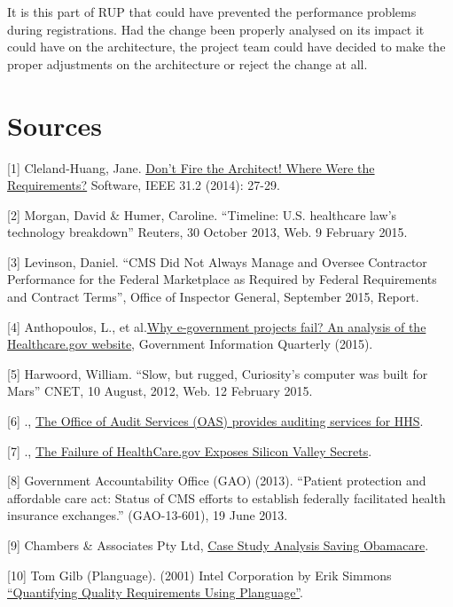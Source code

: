 \documentclass[]{article}
\begin{document}
It is this part of RUP that could have prevented the performance
problems during registrations. Had the change been properly analysed on
its impact it could have on the architecture, the project team could
have decided to make the proper adjustments on the architecture or
reject the change at all.

\section{Sources}\label{sources}

{[}1{]} Cleland-Huang, Jane.
\href{http://ieeexplore.ieee.org/stamp/stamp.jsp?tp=\&arnumber=6774318}{Don't
Fire the Architect! Where Were the Requirements?} Software, IEEE 31.2
(2014): 27-29.

{[}2{]} Morgan, David \& Humer, Caroline. ``Timeline: U.S. healthcare
law's technology breakdown'' Reuters, 30 October 2013, Web. 9 February
2015.

{[}3{]} Levinson, Daniel. ``CMS Did Not Always Manage and Oversee
Contractor Performance for the Federal Marketplace as Required by
Federal Requirements and Contract Terms'', Office of Inspector General,
September 2015, Report.

{[}4{]} Anthopoulos, L., et
al.\href{http://www.sciencedirect.com/science/article/pii/S0740624X15000799}{Why
e-government projects fail? An analysis of the Healthcare.gov website},
Government Information Quarterly (2015).

{[}5{]} Harwoord, William. ``Slow, but rugged, Curiosity's computer was
built for Mars'' CNET, 10 August, 2012, Web. 12 February 2015.

{[}6{]} .,
\href{http://oig.hhs.gov/oas/reports/region3/31403001.pdf}{The Office of
Audit Services (OAS) provides auditing services for HHS}.

{[}7{]} .,
\href{http://www.computer.org/csdl/mags/ic/2014/06/mic2014060085.pdf}{The
Failure of HealthCare.gov Exposes Silicon Valley Secrets}.

{[}8{]} Government Accountability Office (GAO) (2013). ``Patient
protection and affordable care act: Status of CMS efforts to establish
federally facilitated health insurance exchanges.'' (GAO-13-601), 19
June 2013.

{[}9{]} Chambers \& Associates Pty Ltd,
\href{http://www.chambers.com.au/public_resources/case_study/obamacare/saving-obamacare-case-study-analysis.pdf}{Case
Study Analysis Saving Obamacare}.

{[}10{]} Tom Gilb (Planguage). (2001) Intel Corporation by Erik Simmons
\href{http://www.clearspecs.com/downloads/ClearSpecs20V01_Quantifying\%20Quality\%20Requirements.pdf}{``Quantifying
Quality Requirements Using Planguage''}.
\end{document}
